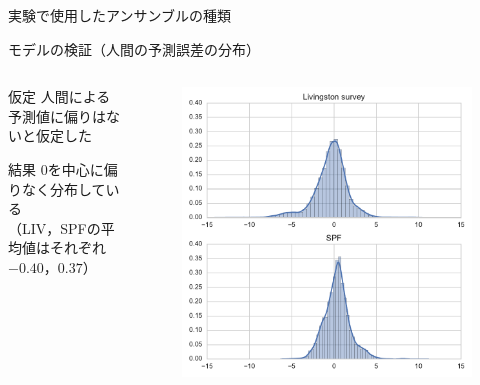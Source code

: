 \documentclass[dvipdfmx,aspectratio=169]{beamer}
\begin{document}
\begin{frame}{実験で使用したアンサンブルの種類}
\begin{table}
  \caption{実験で使用したアンサンブルの種類}
  \begin{center}
    \small
    
  \end{center}
\end{table}
\end{frame}

\begin{frame}{モデルの検証（人間の予測誤差の分布）}
\begin{columns}
  \begin{column}{0.55\textwidth}
    \begin{block}{仮定}
      人間による予測値に偏りはないと仮定した
    \end{block}
    \begin{alertblock}{結果}
      0を中心に偏りなく分布している\\
      （LIV，SPFの平均値はそれぞれ$-0.40$，$0.37$）
    \end{alertblock}
  \end{column}
  \begin{column}{0.45\textwidth}
    \begin{figure}
      \centering
      \includegraphics[width=\columnwidth]{results-error_distribution.pdf}
    \end{figure}
  \end{column}
\end{columns}
\end{frame}
\end{document}
